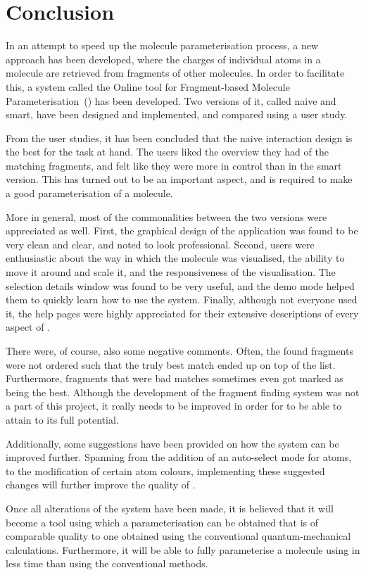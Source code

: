 \chapter{Conclusion}

%

In an attempt to speed up the molecule parameterisation process, a new approach has been developed, where the charges of individual atoms in a molecule are retrieved from fragments of other molecules. In order to facilitate this, a system called the Online tool for Fragment-based Molecule Parameterisation~(\oframp) has been developed. Two versions of it, called naive and smart, have been designed and implemented, and compared using a user study.

From the user studies, it has been concluded that the naive interaction design is the best for the task at hand. The users liked the overview they had of the matching fragments, and felt like they were more in control than in the smart version. This has turned out to be an important aspect, and is required to make a good parameterisation of a molecule.

More in general, most of the commonalities between the two versions were appreciated as well. First, the graphical design of the application was found to be very clean and clear, and noted to look professional. Second, users were enthusiastic about the way in which the molecule was visualised, the ability to move it around and scale it, and the responsiveness of the visualisation. The selection details window was found to be very useful, and the demo mode helped them to quickly learn how to use the system. Finally, although not everyone used it, the help pages were highly appreciated for their extensive descriptions of every aspect of \oframp.

There were, of course, also some negative comments. Often, the found fragments were not ordered such that the truly best match ended up on top of the list. Furthermore, fragments that were bad matches sometimes even got marked as being the best. Although the development of the fragment finding system was not a part of this project, it really needs to be improved in order for \oframp{} to be able to attain to its full potential.

Additionally, some suggestions have been provided on how the system can be improved further. Spanning from the addition of an auto-select mode for atoms, to the modification of certain atom colours, implementing these suggested changes will further improve the quality of \oframp.

Once all alterations of the system have been made, it is believed that it will become a tool using which a parameterisation can be obtained that is of comparable quality to one obtained using the conventional quantum-mechanical calculations. Furthermore, it will be able to fully parameterise a molecule using \oframp{} in less time than using the conventional methods.



